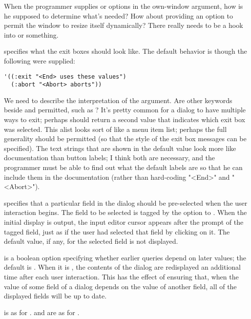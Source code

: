  {When the programmer supplies  or
 options in the own-window argument, how is he supposed to
determine what's needed?  How about providing an option to permit the window to
resize itself dynamically?  There really needs to be a hook into
 or something.}

 specifies what the exit boxes should look like.  The default
behavior is though the following were supplied:

\begin{verbatim}
'((:exit "<End> uses these values")
  (:abort "<Abort> aborts"))
\end{verbatim}

 {We need to describe the interpretation of the 
argument.  Are other keywords beside  and  permitted, such
as ?  It's pretty common for a dialog to have multiple ways to exit;
perhaps  should return a second value that indicates which
exit box was selected.  This alist looks sort of like a menu item list; perhaps
the full generality should be permitted (so that the style of the exit box
messages can be specified).  The text strings that are shown in the default
value look more like documentation than button labels; I think both are
necessary, and the programmer must be able to find out what the default labels
are so that he can include them in the documentation (rather than hard-coding
"<End>" and "<Abort>").}

 specifies that a particular field in the
dialog should be pre-selected when the user interaction begins. The field to be
selected is tagged by the  option to .  When
the initial display is output, the input editor cursor appears after the prompt
of the tagged field, just as if the user had selected that field by clicking on
it. The default value, if any, for the selected field is not displayed.

 is a boolean option specifying whether earlier
queries depend on later values; the default is .  When it is
, the contents of the dialog are redisplayed an additional time after
each user interaction.  This has the effect of ensuring that, when the value of
some field of a dialog depends on the value of another field, all of the
displayed fields will be up to date.

 is as for .   and 
are as for .


